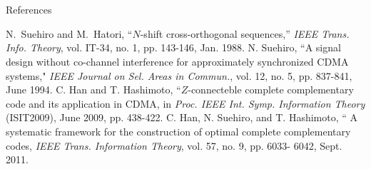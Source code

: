 \documentclass[dvipdfmx]{beamer}
\renewcommand{\maketitle}{%
  \vspace*{1ex}%
  \begin{center}%
    \Huge\inserttitle\\%
    \LARGE\insertauthor\\%
    \Large\insertinstitute%
  \end{center}%
  \vspace*{-1ex}%
}
\begin{document}
\begin{frame}{\maketitle}
\begin{columns}
\begin{column}{.45\textwidth}
       \vspace*{5ex}
      
      
      \begin{block}{References}
        \begin{thebibliography}{10}
N.~Suehiro and M.~Hatori, ``$N$-shift cross-orthogonal sequences,'' {\it IEEE Trans. Info. Theory}, vol. IT-34, no. 1, pp. 143-146, Jan. 1988. 
N. Suehiro, ``A signal design without co-channel interference for approximately synchronized CDMA systems," {\it IEEE Journal on Sel. Areas in Commun.}, vol. 12, no. 5, pp. 837-841, June 1994.
C. Han and T. Hashimoto, ``$Z$-connecteble complete complementary code and its application in CDMA, in {\it Proc. IEEE Int. Symp. Information Theory} (ISIT2009), June 2009, pp. 438-422.
C. Han, N. Suehiro, and T. Hashimoto, `` A systematic framework for the construction of optimal complete complementary codes, {\it IEEE Trans. Information Theory}, vol. 57, no. 9, pp. 6033- 6042, Sept. 2011.
\end{thebibliography}
      \end{block}
    \end{column}
  \end{columns}
\end{frame}
\end{document}
